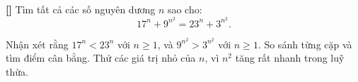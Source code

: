 \documentclass[../04-diophantine-equations.tex]{subfiles}
\begin{document}
\begin{exercise*}\label{example:ROU-2014-MO-G7-P3}\textbf{[]}
    Tìm tất cả các số nguyên dương \( n \) sao cho:
    \[
        17^n + 9^{n^2} = 23^n + 3^{n^2}.
    \]
\end{exercise*}

\begin{remark*}
    Nhận xét rằng \( 17^n < 23^n \) với \( n \ge 1 \), và \( 9^{n^2} > 3^{n^2} \) với \( n \ge 1 \). So sánh từng cặp và tìm điểm cân bằng.  
    Thử các giá trị nhỏ của \( n \), vì \( n^2 \) tăng rất nhanh trong luỹ thừa.
\end{remark*}


\end{document}
